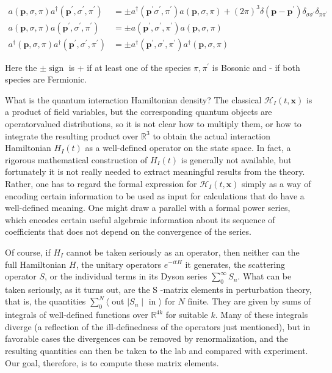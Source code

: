 \documentclass[10pt, letterpaper]{article}
\begin{document}
$$
\begin{aligned}
a(\mathbf{p}, \sigma, \pi) a^{\dagger}\left(\mathbf{p}^{\prime}, \sigma^{\prime}, \pi^{\prime}\right) & = \pm a^{\dagger}\left(\mathbf{p}^{\prime} \sigma^{\prime}, \pi^{\prime}\right) a(\mathbf{p}, \sigma, \pi)+(2 \pi)^{3} \delta\left(\mathbf{p}-\mathbf{p}^{\prime}\right) \delta_{\sigma \sigma^{\prime}} \delta_{\pi \pi^{\prime}} \\
a(\mathbf{p}, \sigma, \pi) a\left(\mathbf{p}^{\prime}, \sigma^{\prime}, \pi^{\prime}\right) & = \pm a\left(\mathbf{p}^{\prime}, \sigma^{\prime}, \pi^{\prime}\right) a(\mathbf{p}, \sigma, \pi) \\
a^{\dagger}(\mathbf{p}, \sigma, \pi) a^{\dagger}\left(\mathbf{p}^{\prime}, \sigma^{\prime}, \pi^{\prime}\right) & = \pm a^{\dagger}\left(\mathbf{p}^{\prime}, \sigma^{\prime}, \pi^{\prime}\right) a^{\dagger}(\mathbf{p}, \sigma, \pi)
\end{aligned}
$$

Here the $\pm \operatorname{sign}$ is + if at least one of the species $\pi, \pi^{\prime}$ is Bosonic and - if both species are Fermionic.

What is the quantum interaction Hamiltonian density? The classical $\mathcal{H}_{I}(t, \mathbf{x})$ is a product of field variables, but the corresponding quantum objects are operatorvalued distributions, so it is not clear how to multiply them, or how to integrate the resulting product over $\mathbb{R}^{3}$ to obtain the actual interaction Hamiltonian $H_{I}(t)$ as a well-defined operator on the state space. In fact, a rigorous mathematical construction of $H_{I}(t)$ is generally not available, but fortunately it is not really needed to extract meaningful results from the theory. Rather, one has to regard the formal expression for $\mathcal{H}_{I}(t, \mathbf{x})$ simply as a way of encoding certain information to be used as input for calculations that do have a well-defined meaning. One might draw a parallel with a formal power series, which encodes certain useful algebraic information about its sequence of coefficients that does not depend on the convergence of the series.

Of course, if $H_{I}$ cannot be taken seriously as an operator, then neither can the full Hamiltonian $H$, the unitary operators $e^{-i t H}$ it generates, the scattering operator $S$, or the individual terms in its Dyson series $\sum_{0}^{\infty} S_{n}$. What can be taken seriously, as it turns out, are the S -matrix elements in perturbation theory, that is, the quantities $\sum_{0}^{N}\langle$ out $| S_{n} \mid$ in $\rangle$ for $N$ finite. They are given by sums of integrals of well-defined functions over $\mathbb{R}^{4 k}$ for suitable $k$. Many of these integrals diverge (a reflection of the ill-definedness of the operators just mentioned), but in favorable cases the divergences can be removed by renormalization, and the resulting quantities can then be taken to the lab and compared with experiment. Our goal, therefore, is to compute these matrix elements.
\end{document}
